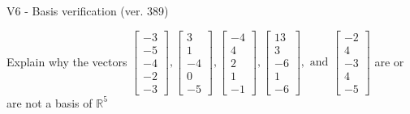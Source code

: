 \begin{exercise}
  \begin{exerciseTitle}V6 - Basis verification (ver. 389)\end{exerciseTitle}
  \begin{exerciseStatement}
    Explain why the vectors \(\left[\begin{array}{r}
-3 \\
-5 \\
-4 \\
-2 \\
-3
\end{array}\right] , \left[\begin{array}{r}
3 \\
1 \\
-4 \\
0 \\
-5
\end{array}\right] , \left[\begin{array}{r}
-4 \\
4 \\
2 \\
1 \\
-1
\end{array}\right] , \left[\begin{array}{r}
13 \\
3 \\
-6 \\
1 \\
-6
\end{array}\right] , \text{ and } \left[\begin{array}{r}
-2 \\
4 \\
-3 \\
4 \\
-5
\end{array}\right]\) are or are not a basis of \(\mathbb{R}^5\)	



\end{exerciseStatement}
\end{exercise}
